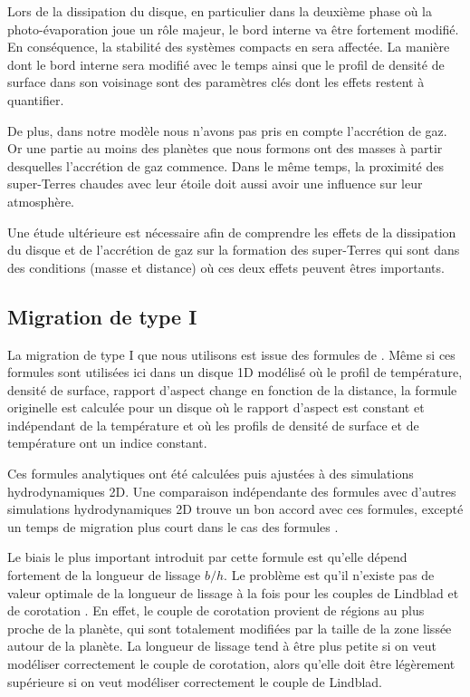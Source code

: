Lors de la dissipation du disque, en particulier dans la deuxième phase où la photo-évaporation joue un rôle majeur, le bord interne va être fortement modifié. En conséquence, la stabilité des systèmes compacts en sera affectée. La manière dont le bord interne sera modifié avec le temps ainsi que le profil de densité de surface dans son voisinage sont des paramètres clés dont les effets restent à quantifier. 

De plus, dans notre modèle nous n'avons pas pris en compte l'accrétion de gaz. Or une partie au moins des planètes que nous formons ont des masses à partir desquelles l'accrétion de gaz commence. Dans le même temps, la proximité des super-Terres chaudes avec leur étoile doit aussi avoir une influence sur leur atmosphère. 

Une étude ultérieure est nécessaire afin de comprendre les effets de la dissipation du disque et de l'accrétion de gaz sur la formation des super-Terres qui sont dans des conditions (masse et distance) où ces deux effets peuvent êtres importants.

\subsection{Migration de type I}
La migration de type I que nous utilisons est issue des formules de \cite{paardekooper2011torque}. Même si ces formules sont utilisées ici dans un disque 1D modélisé où le profil de température, densité de surface, rapport d'aspect change en fonction de la distance, la formule originelle est calculée pour un disque où le rapport d'aspect est constant et indépendant de la température et où les profils de densité de surface et de température ont un indice constant. 

Ces formules analytiques ont été calculées puis ajustées à des simulations hydrodynamiques 2D. Une comparaison indépendante des formules avec d'autres simulations hydrodynamiques 2D trouve un bon accord avec ces formules, excepté un temps de migration plus court dans le cas des formules \citep{pierens2013makingaccepted}. 

Le biais le plus important introduit par cette formule est qu'elle dépend fortement de la longueur de lissage $b/h$. Le problème est qu'il n'existe pas de valeur optimale de la longueur de lissage à la fois pour les couples de Lindblad et de corotation \citep{masset2002coorbital}. En effet, le couple de corotation provient de régions au plus proche de la planète, qui sont totalement modifiées par la taille de la zone lissée autour de la planète. La longueur de lissage tend à être plus petite si on veut modéliser correctement le couple de corotation, alors qu'elle doit être légèrement supérieure si on veut modéliser correctement le couple de Lindblad. 


